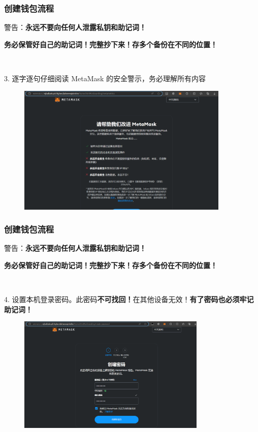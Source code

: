 \documentclass{beamer}
\begin{document}
\begin{frame}
    \frametitle{创建钱包流程}

    警告：\textbf{永远不要向任何人泄露私钥和助记词！}

    \textbf{务必保管好自己的助记词！完整抄下来！存多个备份在不同的位置！}

    \

    3. 逐字逐句仔细阅读 MetaMask 的安全警示，务必理解所有内容

    \begin{figure}[htbp]
        \centering
        \includegraphics[width=0.9\textwidth]{m3.png}
    \end{figure}

\end{frame}

\begin{frame}
    \frametitle{创建钱包流程}

    警告：\textbf{永远不要向任何人泄露私钥和助记词！}

    \textbf{务必保管好自己的助记词！完整抄下来！存多个备份在不同的位置！}

    \

    4. 设置本机登录密码。此密码\textbf{不可找回！}在其他设备无效！\textbf{有了密码也必须牢记助记词！}

    \begin{figure}[htbp]
        \centering
        \includegraphics[width=0.8\textwidth]{m4.png}
    \end{figure}

\end{frame}
\end{document}
